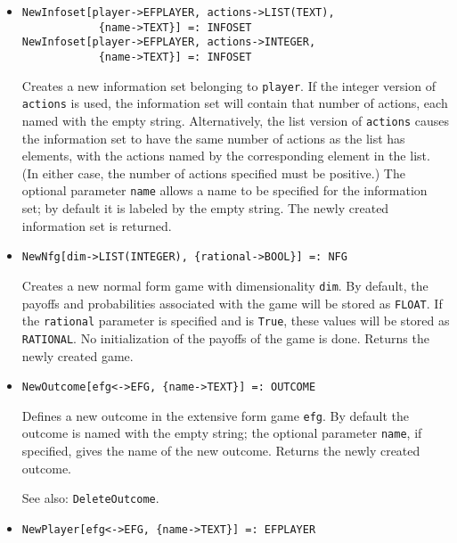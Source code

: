 \begin{itemize}
\item
\protect \large \begin{verbatim} 
NewInfoset[player->EFPLAYER, actions->LIST(TEXT),
            {name->TEXT}] =: INFOSET
NewInfoset[player->EFPLAYER, actions->INTEGER,
            {name->TEXT}] =: INFOSET
\end{verbatim}\normalsize

\bd
Creates a new information set belonging to \verb+player+.
If the integer version of \verb+actions+ is used, the information set
will contain that number of actions, each named with the empty string.
Alternatively, the list version of \verb+actions+ causes the information
set to have the same number of actions as the list has elements, with
the actions named by the corresponding element in the list.  (In either
case, the number of actions specified must be positive.)  The optional
parameter \verb+name+ allows a name to be specified for the information
set; by default it is labeled by the empty string.  The newly created
information set is returned.
\ed

\item
\protect \large \begin{verbatim}
NewNfg[dim->LIST(INTEGER), {rational->BOOL}] =: NFG
\end{verbatim}\normalsize

\bd
Creates a new normal form game with dimensionality \verb+dim+.
By default, the payoffs and probabilities associated with the game will
be stored as {\tt FLOAT}.  If the \verb+rational+ parameter is specified
and is \verb+True+, these values will be stored as {\tt RATIONAL}.
No initialization of the payoffs of the game is done.
Returns the newly created game.
\ed

\item
\protect \large \begin{verbatim} 
NewOutcome[efg<->EFG, {name->TEXT}] =: OUTCOME
\end{verbatim}\normalsize

\bd
Defines a new outcome in the extensive form game \verb+efg+.
By default the outcome is named with the empty string; the optional parameter
\verb+name+, if specified, gives the name of the new outcome.  Returns the
newly created outcome.
\item
[See also:] {\tt DeleteOutcome}.
\ed

\item
\protect \large \begin{verbatim}
NewPlayer[efg<->EFG, {name->TEXT}] =: EFPLAYER 
\end{verbatim}\normalsize


\end{itemize}

